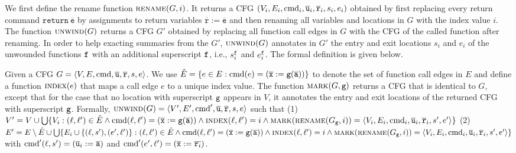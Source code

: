 We first define the rename function $\textsc{rename}(G,i)$. It returns a CFG $(V_i, E_i,\textmd{cmd}_i, \overline{\texttt{u}}_i, \overline{\texttt{r}}_i,s_i,e_i)$ obtained by first replacing every return command $\mathtt{return}\ \overline{\texttt{e}}$ by assignments to return variables $\overline{\texttt{r}} := \overline{\texttt{e}}$ and then renaming all variables and locations in $G$ with the index value $i$. The function $\textsc{unwind}(G)$ returns a CFG $G'$ obtained by replacing all function call edges in $G$ with the CFG of the called function after renaming. In order to help exacting summaries from the $G'$, $\textsc{unwind}(G)$ annotates in $G'$ the entry and exit locations ${s_i}$ and ${e_i}$ of the unwounded functions $\mathtt{{f}}$ with an additional superscript $\mathtt{{f}}$, i.e., $s_i^{\mathtt{{f}}}$ and $e_i^{\mathtt{{f}}}$. The formal definition is given below.

Given a CFG $G=\langle
V, E,\textmd{cmd}, \overline{\texttt{u}}, \overline{\texttt{r}},s,e \rangle$.
We use $\hat{E} =\{e\in E: \textmd{cmd} (e)= (\overline{\texttt{x}}:=\mathtt{g}(\overline{\texttt{a}}))\}$ to denote the set of function call edges in $E$ and define a function $\textsc{index}(e)$ that maps a call edge $e$ to a unique index value.
The function $\textsc{mark}(G,\mathtt{{g}})$ returns a CFG that is identical to $G$, except that for the case that no location with superscript $\mathtt{{g}}$ appears in $V$, it annotates the entry and exit locations of the returned CFG with superscript $\mathtt{{g}}$.
Formally, $\textsc{unwind}(G) = \langle V', E',\textmd{cmd}', \overline{\texttt{u}}, \overline{\texttt{r}},s,e \rangle$ such that 
(1) $V' = V\cup \bigcup\{V_i:(\ell, \ell')\in \hat{E} \wedge \textmd{cmd}(\ell, \ell')=(\overline{\texttt{x}}:=\mathtt{g}(\overline{\texttt{a}}))\wedge \textsc{index}(\ell, \ell')=i \wedge 
\textsc{mark}(\textsc{rename}(G_{\mathtt{{g}}},i))=
\langle V_i, E_i,\textmd{cmd}_i, \overline{\texttt{u}}_i, \overline{\texttt{r}}_i,s',e'\rangle \}$ 
(2) $E'= E \setminus \hat{E} \cup \bigcup\{E_i\cup\{(\ell, s'),(e', \ell')\}: (\ell, \ell')\in \hat{E} \wedge 
\textmd{cmd}(\ell, \ell')=(\overline{\texttt{x}}:=\mathtt{g}(\overline{\texttt{a}}))\wedge \textsc{index}(\ell, \ell')=i \wedge 
\textsc{mark}(\textsc{rename}(G_{\mathtt{{g}}},i))=
\langle V_i, E_i,\textmd{cmd}_i, \overline{\texttt{u}}_i, \overline{\texttt{r}}_i,s',e'\rangle \}$ with $\textmd{cmd}' (\ell, s') = (\overline{\texttt{u}}_i:=\overline{\texttt{a}})$ and $\textmd{cmd}' (e', \ell') = (\overline{\texttt{x}}:=\overline{\texttt{r}_i})$.




